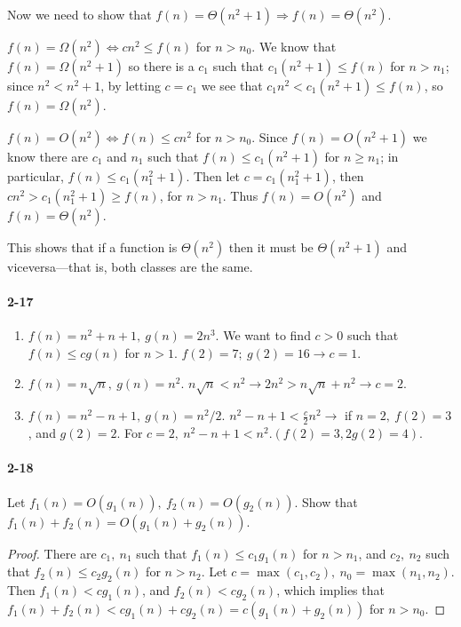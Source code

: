 \documentclass{report}
\begin{document}
\medskip

Now we need to show that $f(n) = \Theta(n^2+1) \Rightarrow f(n) = \Theta(n^2)$.

$f(n) = \Omega(n^2) \Leftrightarrow c n^2 \le f(n)$ for $n > n_0$. We know that $f(n) = \Omega(n^2+1)$ so there is a $c_1$ such that $c_1\left(n^2+1\right) \le f(n)$ for $n > n_1$; since $n^2 < n^2 + 1$, by letting $c = c_1$ we see that $c_1 n^2 < c_1 \left(n^2+1\right) \le f(n)$, so $f(n) = \Omega(n^2)$.

$f(n) = O(n^2) \Leftrightarrow f(n) \le c n^2$ for $n > n_0$. Since $f(n) = O(n^2 + 1)$ we know there are $c_1$ and $n_1$ such that $f(n) \le c_1\left(n^2+1\right)$ for $n \ge n_1$; in particular, $f(n) \le c_1\left(n_1^2+1\right)$. Then let $c = c_1\left(n_1^2+1\right)$, then $c n^2 > c_1\left(n_1^2+1\right) \ge f(n)$, for $n > n_1$. Thus $f(n) = O(n^2)$ and $f(n) = \Theta(n^2)$.

\medskip

This shows that if a function is $\Theta(n^2)$ then it must be $\Theta(n^2+1)$ and viceversa---that is, both classes are the same.

\paragraph{2-17}
\begin{enumerate}[label=\alph*)]
	\item $f(n) = n^2 + n + 1,\ g(n) = 2n^3$. We want to find $c > 0$ such that $f(n) \le c g(n)$ for $n > 1$. $f(2) = 7;\ g(2) = 16 \rightarrow c = 1$.
	\item $f(n) = n\sqrt{n},\ g(n) = n^2$. $n\sqrt{n} < n^2 \rightarrow 2n^2 > n\sqrt{n} + n^2 \rightarrow c = 2$.
	\item $f(n) = n^2 - n + 1,\ g(n) = n^2/2$. $n^2 - n + 1 < \frac{c}{2}n^2 \rightarrow$ if $n = 2,\ f(2) = 3$, and $g(2) = 2$. For $c=2,\ n^2 - n + 1 < n^2. (f(2) = 3, 2g(2) = 4)$.
\end{enumerate}

\paragraph{2-18} Let $f_1(n) = O(g_1(n)),\ f_2(n) = O(g_2(n))$. Show that $f_1(n) + f_2(n) = O(g_1(n) + g_2(n))$.

\begin{proof}There are $c_1,\ n_1$ such that $f_1(n) \le c_1 g_1(n)$ for $n > n_1$, and $c_2,\ n_2$ such that $f_2(n) \le c_2 g_2(n)$ for $n > n_2$. Let $c = \max(c_1, c_2),\ n_0 = \max(n_1, n_2)$. Then $f_1(n) < c g_1(n)$, and $f_2(n) < c g_2(n)$, which implies that $f_1(n) + f_2(n) < c g_1(n) + c g_2(n) = c(g_1(n) + g_2(n))$ for $n > n_0$.
\end{proof}
\end{document}
